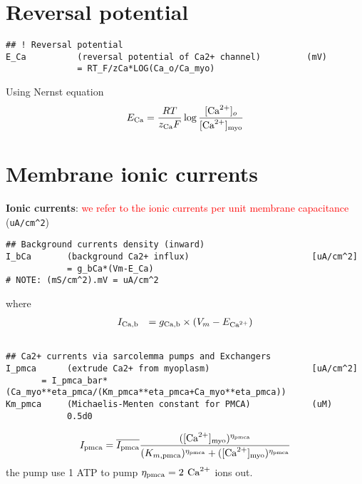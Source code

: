 \section{Reversal potential}
\label{sec:reversal-potential}

\begin{verbatim}
## ! Reversal potential
E_Ca          (reversal potential of Ca2+ channel)         (mV)
              = RT_F/zCa*LOG(Ca_o/Ca_myo)  
\end{verbatim}
Using Nernst equation
\begin{eqnarray}
  \label{eq:9}
  E_{\text{Ca}} = \frac{RT}{z_{\text{Ca}} F}\log\frac{[{\text{Ca}^{2+}}]_o}{[{\text{Ca}^{2+}}]_{\text{myo}}}
\end{eqnarray}

\section{Membrane ionic currents}
\label{sec:membr-ionic-curr}

{\bf Ionic currents}: \textcolor{red}{we refer to the ionic currents per unit membrane
capacitance} (\verb!uA/cm^2!)

\begin{verbatim}
## Background currents density (inward)
I_bCa       (background Ca2+ influx)                        [uA/cm^2]                                
            = g_bCa*(Vm-E_Ca)
# NOTE: (mS/cm^2).mV = uA/cm^2
\end{verbatim}
where
\begin{eqnarray}
  \label{eq:8}
  I_{\text{Ca,b}} &&= g_{\text{Ca,b}} \times (V_m-E_{\text{Ca}^{2+}}) 
\end{eqnarray}
\begin{verbatim}

## Ca2+ currents via sarcolemma pumps and Exchangers
I_pmca      (extrude Ca2+ from myoplasm)                    [uA/cm^2]
       = I_pmca_bar*(Ca_myo**eta_pmca/(Km_pmca**eta_pmca+Ca_myo**eta_pmca))
Km_pmca     (Michaelis-Menten constant for PMCA)            (uM)
            0.5d0

\end{verbatim}
\begin{equation}
  \label{eq:10}
    I_{\text{pmca}} = \overline{I_{\text{pmca}}}  \frac{([{\text{Ca}^{2+}}]_{\text{myo}})^{\eta_{\text{pmca}}}}{(K_{m,{\text{pmca}}})^{\eta_{\text{pmca}}}+([{\text{Ca}^{2+}}]_{\text{myo}})^{\eta_{\text{pmca}}}} 
\end{equation}
the pump use 1 ATP to pump $\eta_{\text{pmca}}=2$ ${\text{Ca}^{2+}}$ ions out. 

